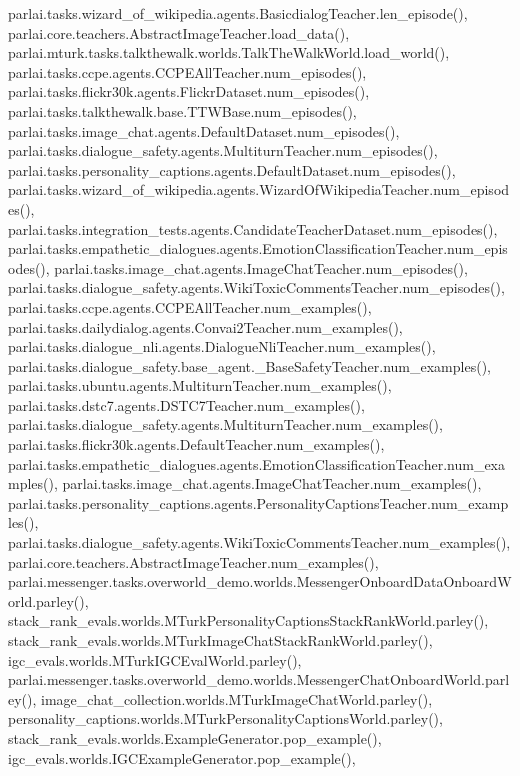 parlai.\+tasks.\+wizard\+\_\+of\+\_\+wikipedia.\+agents.\+Basicdialog\+Teacher.\+len\+\_\+episode(), parlai.\+core.\+teachers.\+Abstract\+Image\+Teacher.\+load\+\_\+data(), parlai.\+mturk.\+tasks.\+talkthewalk.\+worlds.\+Talk\+The\+Walk\+World.\+load\+\_\+world(), parlai.\+tasks.\+ccpe.\+agents.\+C\+C\+P\+E\+All\+Teacher.\+num\+\_\+episodes(), parlai.\+tasks.\+flickr30k.\+agents.\+Flickr\+Dataset.\+num\+\_\+episodes(), parlai.\+tasks.\+talkthewalk.\+base.\+T\+T\+W\+Base.\+num\+\_\+episodes(), parlai.\+tasks.\+image\+\_\+chat.\+agents.\+Default\+Dataset.\+num\+\_\+episodes(), parlai.\+tasks.\+dialogue\+\_\+safety.\+agents.\+Multiturn\+Teacher.\+num\+\_\+episodes(), parlai.\+tasks.\+personality\+\_\+captions.\+agents.\+Default\+Dataset.\+num\+\_\+episodes(), parlai.\+tasks.\+wizard\+\_\+of\+\_\+wikipedia.\+agents.\+Wizard\+Of\+Wikipedia\+Teacher.\+num\+\_\+episodes(), parlai.\+tasks.\+integration\+\_\+tests.\+agents.\+Candidate\+Teacher\+Dataset.\+num\+\_\+episodes(), parlai.\+tasks.\+empathetic\+\_\+dialogues.\+agents.\+Emotion\+Classification\+Teacher.\+num\+\_\+episodes(), parlai.\+tasks.\+image\+\_\+chat.\+agents.\+Image\+Chat\+Teacher.\+num\+\_\+episodes(), parlai.\+tasks.\+dialogue\+\_\+safety.\+agents.\+Wiki\+Toxic\+Comments\+Teacher.\+num\+\_\+episodes(), parlai.\+tasks.\+ccpe.\+agents.\+C\+C\+P\+E\+All\+Teacher.\+num\+\_\+examples(), parlai.\+tasks.\+dailydialog.\+agents.\+Convai2\+Teacher.\+num\+\_\+examples(), parlai.\+tasks.\+dialogue\+\_\+nli.\+agents.\+Dialogue\+Nli\+Teacher.\+num\+\_\+examples(), parlai.\+tasks.\+dialogue\+\_\+safety.\+base\+\_\+agent.\+\_\+\+Base\+Safety\+Teacher.\+num\+\_\+examples(), parlai.\+tasks.\+ubuntu.\+agents.\+Multiturn\+Teacher.\+num\+\_\+examples(), parlai.\+tasks.\+dstc7.\+agents.\+D\+S\+T\+C7\+Teacher.\+num\+\_\+examples(), parlai.\+tasks.\+dialogue\+\_\+safety.\+agents.\+Multiturn\+Teacher.\+num\+\_\+examples(), parlai.\+tasks.\+flickr30k.\+agents.\+Default\+Teacher.\+num\+\_\+examples(), parlai.\+tasks.\+empathetic\+\_\+dialogues.\+agents.\+Emotion\+Classification\+Teacher.\+num\+\_\+examples(), parlai.\+tasks.\+image\+\_\+chat.\+agents.\+Image\+Chat\+Teacher.\+num\+\_\+examples(), parlai.\+tasks.\+personality\+\_\+captions.\+agents.\+Personality\+Captions\+Teacher.\+num\+\_\+examples(), parlai.\+tasks.\+dialogue\+\_\+safety.\+agents.\+Wiki\+Toxic\+Comments\+Teacher.\+num\+\_\+examples(), parlai.\+core.\+teachers.\+Abstract\+Image\+Teacher.\+num\+\_\+examples(), parlai.\+messenger.\+tasks.\+overworld\+\_\+demo.\+worlds.\+Messenger\+Onboard\+Data\+Onboard\+World.\+parley(), stack\+\_\+rank\+\_\+evals.\+worlds.\+M\+Turk\+Personality\+Captions\+Stack\+Rank\+World.\+parley(), stack\+\_\+rank\+\_\+evals.\+worlds.\+M\+Turk\+Image\+Chat\+Stack\+Rank\+World.\+parley(), igc\+\_\+evals.\+worlds.\+M\+Turk\+I\+G\+C\+Eval\+World.\+parley(), parlai.\+messenger.\+tasks.\+overworld\+\_\+demo.\+worlds.\+Messenger\+Chat\+Onboard\+World.\+parley(), image\+\_\+chat\+\_\+collection.\+worlds.\+M\+Turk\+Image\+Chat\+World.\+parley(), personality\+\_\+captions.\+worlds.\+M\+Turk\+Personality\+Captions\+World.\+parley(), stack\+\_\+rank\+\_\+evals.\+worlds.\+Example\+Generator.\+pop\+\_\+example(), igc\+\_\+evals.\+worlds.\+I\+G\+C\+Example\+Generator.\+pop\+\_\+example(), 